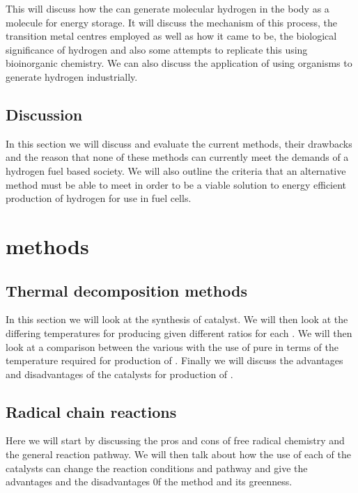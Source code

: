 \documentclass[a4paper]{article}
\begin{document}
This will discuss how the  can generate molecular hydrogen in the body as a molecule for energy storage. 
It will discuss the mechanism of this process, the transition metal centres employed as well as how it came to be, the biological significance of hydrogen and also some attempts to replicate this using bioinorganic chemistry.
We can also discuss the application of using organisms to generate hydrogen industrially.

\subsection{Discussion}%
\label{sub:discussion_trad}
In this section we will discuss and evaluate the current methods, their drawbacks and the reason that none of these methods can currently meet the demands of a hydrogen fuel based society.
We will also outline the criteria that an alternative method must be able to meet in order to be a viable solution to energy efficient production of hydrogen for use in fuel cells.

\section{ methods}%
\label{sub:ch4_methods}

\subsection{Thermal decomposition methods}%
\label{sub:Thermal_decomposition_methods}
In this section we will look at the synthesis of  catalyst.
We will then look at the differing temperatures for producing  given different  ratios for each .
We will then look at a comparison between the various  with the use of pure  in terms of the temperature required for production of .
Finally we will discuss the advantages and disadvantages of the  catalysts for production of .

\subsection{Radical chain reactions}%
\label{sub:Radical_chain_reactions}
Here we will start by discussing the pros and cons of free radical chemistry and the general reaction pathway. 
We will then talk about how the use of each of the catalysts can change the reaction conditions and pathway and give the advantages and the disadvantages 0f the method and its greenness.
\end{document}
